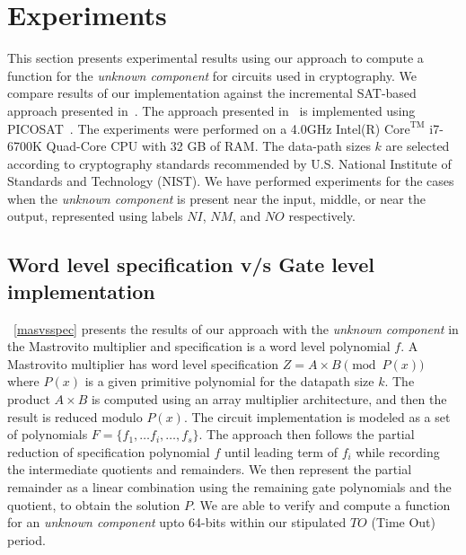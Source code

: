 \section{Experiments}
\label{sec:exp}

This section presents experimental results using our approach to compute a function for the \textit{unknown component} for circuits used in cryptography.
We compare results of our implementation against the incremental SAT-based approach presented in~\cite{fujita:2015}.
The approach presented in~\cite{fujita:2015} is implemented using PICOSAT~\cite{picosat}. The experiments were performed on a 4.0GHz 
Intel(R) $\text{Core}^{\text{TM}}$ i7-6700K Quad-Core CPU with 32 GB of RAM. The data-path sizes {$k$} are selected according to cryptography standards recommended by U.S. National Institute of Standards and Technology (NIST). 
We have performed experiments for the cases when the {\it unknown component} is present near 
the input, middle, or near the output, represented using labels $NI$, $NM$, and $NO$ respectively.

\subsection{Word level specification v/s Gate level implementation}
~\autoref{masvsspec} presents the results of our approach with the {\it unknown component} 
in the Mastrovito multiplier and specification is a word level polynomial $f$. 
A Mastrovito multiplier has word level specification $Z = A\times B \pmod{ P(x)}$ 
where $P(x)$ is a given primitive polynomial for the datapath size $k$. The product $A \times B$ 
is computed using an array multiplier architecture, and then the result is reduced modulo $P(x)$. 
The circuit implementation is modeled as a set of polynomials $F=\{f_1,\dots f_i,\dots,f_s\}$. The 
approach then follows the partial reduction of specification polynomial $f$ until leading term of $f_i$ while
recording the intermediate quotients and remainders. We then represent the partial remainder as a linear combination
using the remaining gate polynomials and the quotient, to obtain the solution $P$. We 
are able to verify and compute a function for an {\it unknown component} upto 64-bits within our stipulated $TO$ (Time Out) period.

